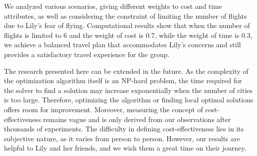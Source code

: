 \documentclass{article}
\begin{document}
We analyzed various scenarios, giving different weights to cost and time attributes, as well as considering the constraint of limiting the number of flights due to Lily's fear of flying. Computational results show that when the number of flights is limited to 6 and the weight of cost is 0.7, while the weight of time is 0.3, we achieve a balanced travel plan that accommodates Lily's concerns and still provides a satisfactory travel experience for the group.

The research presented here can be extended in the future. As the complexity of the optimization algorithm itself is an NP-hard problem, the time required for the solver to find a solution may increase exponentially when the number of cities is too large. Therefore, optimizing the algorithm or finding local optimal solutions offers room for improvement. Moreover, measuring the concept of cost-effectiveness remains vague and is only derived from our observations after thousands of experiments. The difficulty in defining cost-effectiveness lies in its subjective nature, as it varies from person to person. However, our results are helpful to Lily and her friends, and we wish them a great time on their journey.
\clearpage
\appendix
\end{document}
